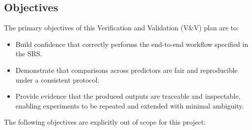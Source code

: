 \documentclass[12pt, titlepage]{article}
\begin{document}
\subsection{Objectives}



The primary objectives of this Verification and Validation (V\&V) plan are to:

\begin{itemize}
  \item Build confidence that correctly performs the end-to-end
  workflow specified in the SRS. 
  \item Demonstrate that comparisons across predictors are fair and reproducible under a consistent protocol.
  \item Provide evidence that the produced outputs are traceable and inspectable, enabling experiments to be repeated and extended with minimal ambiguity.
\end{itemize}

The following objectives are explicitly out of scope for this project:
\end{document}

